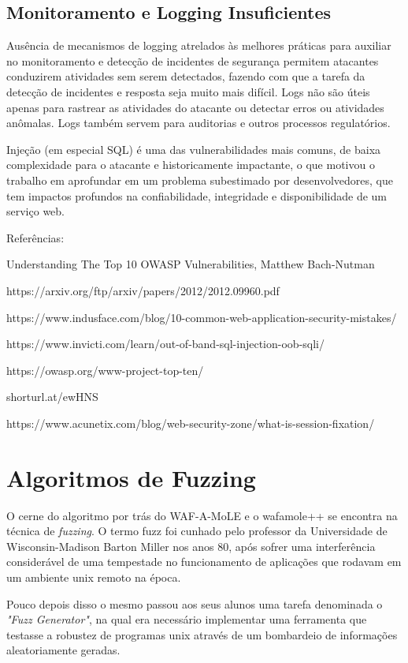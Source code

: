 \subsection{Monitoramento e Logging Insuficientes}
Ausência de mecanismos de logging atrelados às melhores práticas para auxiliar no monitoramento e detecção de incidentes de segurança permitem atacantes conduzirem atividades sem serem detectados, fazendo com que a tarefa da detecção de incidentes e resposta seja muito mais difícil. Logs não são úteis apenas para rastrear as atividades do atacante ou detectar erros ou atividades anômalas. Logs também servem para auditorias e outros processos regulatórios.

Injeção (em especial SQL) é uma das vulnerabilidades mais comuns, de baixa complexidade para o atacante e historicamente impactante, o que motivou o trabalho em aprofundar em um problema subestimado por desenvolvedores, que tem impactos profundos na confiabilidade, integridade e disponibilidade de um serviço web.

Referências:

Understanding The Top 10 OWASP Vulnerabilities, Matthew Bach-Nutman

https://arxiv.org/ftp/arxiv/papers/2012/2012.09960.pdf

https://www.indusface.com/blog/10-common-web-application-security-mistakes/

https://www.invicti.com/learn/out-of-band-sql-injection-oob-sqli/

https://owasp.org/www-project-top-ten/

shorturl.at/ewHNS

https://www.acunetix.com/blog/web-security-zone/what-is-session-fixation/

\section{Algoritmos de Fuzzing}

O cerne do algoritmo por trás do WAF-A-MoLE e o wafamole++ se encontra na técnica de \textit{fuzzing}. O termo fuzz foi cunhado pelo professor da Universidade de Wisconsin-Madison Barton Miller nos anos 80, após sofrer uma interferência considerável de uma tempestade no funcionamento de aplicações que rodavam em um ambiente unix remoto na época. 

Pouco depois disso o mesmo passou aos seus alunos uma tarefa denominada o \textit{"Fuzz Generator"}, na qual era necessário implementar uma ferramenta que testasse a robustez de programas unix através de um bombardeio de informações aleatoriamente geradas.

